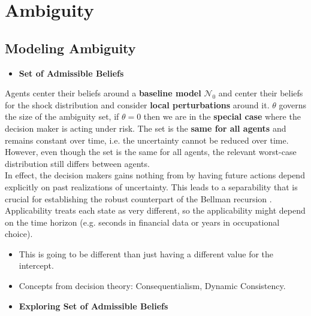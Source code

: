 \section{Ambiguity}


\subsection{Modeling Ambiguity}
\begin{itemize}\item[] \textbf{Set of Admissible Beliefs}\end{itemize}
Agents center their beliefs around a \textbf{baseline model} $\mathcal{N}_0$ and center their beliefs for the shock distribution and consider \textbf{local perturbations} around it. $\theta$ governs the size of the ambiguity set, if $\theta = 0$ then we are in the \textbf{special case} where the decision maker is acting under risk. The set is the \textbf{same for all agents} and remains constant over time, i.e. the uncertainty cannot be reduced over time. However, even though the set is the same for all agents, the relevant worst-case distribution still differs between agents.\\\newline
%
In effect, the decision makers gains nothing from by having future actions depend explicitly on past realizations of uncertainty. This leads to a separability that is crucial for establishing the robust counterpart of the Bellman recursion \citep{Iyengar.2005}. Applicability treats each state as very different, so the applicability might depend on the time horizon (e.g. seconds in financial data or years in occupational choice).
%
\begin{itemize}
\item This is going to be different than just having a different value for the intercept.
\item Concepts from decision theory: Consequentialism, Dynamic Consistency.
\end{itemize}
\begin{itemize}\item[] \textbf{Exploring Set of Admissible Beliefs}\end{itemize}

